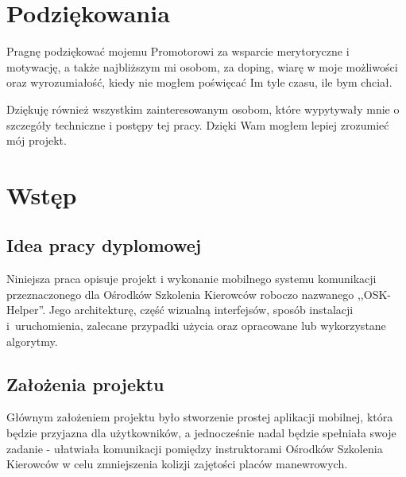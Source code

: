 \documentclass[twoside,a4paper,openright,12pt]{book}
\begin{document}



\frontmatter

\chapter*{Podziękowania}

Pragnę podziękować mojemu Promotorowi za wsparcie merytoryczne i motywację, a także najbliższym mi osobom, za doping, wiarę w moje możliwości oraz wyrozumiałość, kiedy nie mogłem poświęcać Im tyle czasu, ile bym chciał.

Dziękuję również wszystkim zainteresowanym osobom, które wypytywały mnie o szczegóły techniczne i postępy tej pracy. Dzięki Wam mogłem lepiej zrozumieć mój projekt.

\tableofcontents


\mainmatter

\chapter{Wstęp}
\section{Idea pracy dyplomowej}

Niniejsza praca opisuje projekt i wykonanie mobilnego systemu komunikacji przeznaczonego dla Ośrodków Szkolenia Kierowców roboczo nazwanego ,,OSK-Helper''. Jego architekturę, część wizualną interfejsów, sposób instalacji i~uruchomienia, zalecane przypadki użycia oraz opracowane lub wykorzystane algorytmy.


\section{Założenia projektu}

Głównym założeniem projektu było stworzenie prostej aplikacji mobilnej, która będzie przyjazna dla użytkowników, a jednocześnie nadal będzie spełniała swoje zadanie - ułatwiała komunikacji pomiędzy instruktorami Ośrodków Szkolenia Kierowców w celu zmniejszenia kolizji zajętości placów manewrowych.
\end{document}
